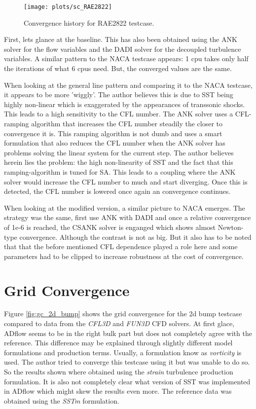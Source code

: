 \begin{figure}[H] \centering
    \texttt{[image: plots/sc\_RAE2822]}
    \caption{Convergence history for RAE2822 testcase.}
    \label{fig:sc_RAE2822}
\end{figure}

\noindent First, lets glance at the baseline. This has also been obtained
using the ANK solver for the flow variables and the DADI solver for the
decoupled turbulence variables. A similar pattern to the NACA
testcase appears: 1 cpu takes only half the iterations of what 6 cpus need.
But, the converged values are the same. 

When looking at the general line pattern and comparing it to the NACA testcase,
it appears to be more 'wiggly'. The author believes this is due to SST being
highly non-linear which is exaggerated by the appearances of transsonic shocks.
This leads to a high sensitivity to the CFL number. The ANK solver uses a
CFL-ramping algorithm that increases the CFL number steadily the closer to
convergence it is. This ramping algorithm is not dumb and uses a smart
formulation that also reduces the CFL number when the ANK solver has problems
solving the linear system for the current step. The author believes herein lies
the problem: the high non-linearity of SST and the fact that this
ramping-algorithm is tuned for SA. This leads to a coupling where the ANK
solver would increase the CFL number to much and start diverging. Once this is
detected, the CFL number is lowered once again an convergence continues. 

When looking at the modified version, a similar picture to NACA emerges. The
strategy was the same, first use ANK with DADI and once a relative convergence
of 1e-6 is reached, the CSANK solver is enganged which shows almost Newton-type
convergence. Although the contrast is not as big. But it also has to be noted
that that the before mentioned CFL dependence played a role here and some
parameters had to be clipped to increase robustness at the cost of convergence.





\section{Grid Convergence}
Figure \ref{fig:gc_2d_bump} shows the grid convergence for the 2d bump testcase
compared to data from the \textit{CFL3D} and \textit{FUN3D} CFD solvers. At
first glace, ADflow seems to be in the right bulk part but does not completely
agree with the reference. This difference may be explained through slightly
different model formulations and production terms. Usually, a formulation know
as \textit{vorticity} is used. The author tried to converge this testcase using
it but was unable to do so. So the results shown where obtained using the
\textit{strain} turbulence production formulation. It is also not completely
clear what version of SST was implemented in ADflow which might skew the
results even more. The reference data was obtained using the \textit{SSTm}
formulation. 

